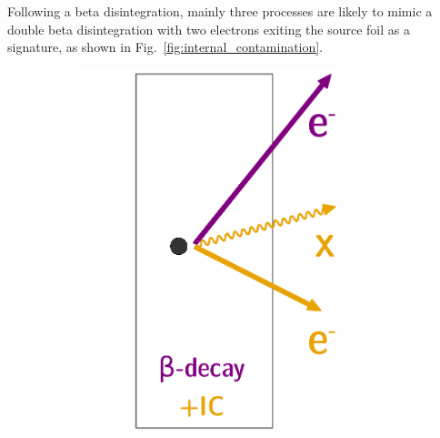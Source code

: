 Following a beta disintegration, mainly three processes are likely to mimic a double beta disintegration with two electrons exiting the source foil as a signature, as shown in Fig.~\ref{fig:internal_contamination}.
\begin{figure}[!h]
\centering
\begin{subfigure}[t]{0.32\textwidth}
  \centering
  \includegraphics[width=0.82\textwidth]{SNdemonstrator/fig_SNdemonstrator/internal_contamination_IC.pdf}
  \captionsetup{justification=justified}
  \caption{
    \label{subfig:int_cont_IC}}
\end{subfigure}
\hfill
\begin{subfigure}[t]{0.32\textwidth}
  \centering

\end{subfigure}
\end{figure}
